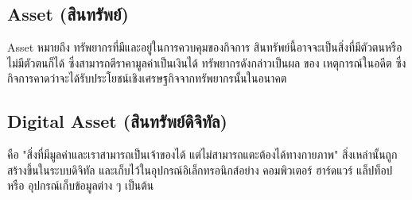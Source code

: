 \documentclass[12pt,oneside,openright,a4paper]{cpe-thai-project}
\begin{document}
\subsection{Asset (สินทรัพย์)  \cite{asset}}
\tab Asset หมายถึง ทรัพยากรที่มีและอยู่ในการควบคุมของกิจการ สินทรัพย์นี้อาจจะเป็นสิ่งที่มีตัวตนหรือไม่มีตัวตนก็ได้ ซึ่งสามารถตีราคามูลค่าเป็นเงินได้ ทรัพยากรดังกล่าวเป็นผล ของ เหตุการณ์ในอดีต ซึ่งกิจการคาดว่าจะได้รับประโยชน์เชิงเศรษฐกิจจากทรัพยากรนั้นในอนาคต

\subsection{Digital Asset (สินทรัพย์ดิจิทัล)  \cite{digital-asset}}
\tab คือ "สิ่งที่มีมูลค่าและเราสามารถเป็นเจ้าของได้ แต่ไม่สามารถแตะต้องได้ทางกายภาพ" สิ่งเหล่านั้นถูกสร้างขึ้นในระบบดิจิทัล และเก็บไว้ในอุปกรณ์อิเล็กทรอนิกส์อย่าง คอมพิวเตอร์ ฮาร์ดแวร์ แล็ปท็อป หรือ อุปกรณ์เก็บข้อมูลต่าง ๆ เป็นต้น
\end{document}
